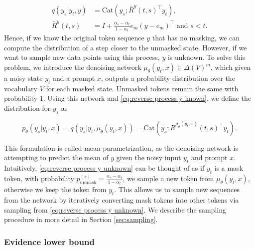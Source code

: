 \begin{align}
    q(y_s | y_t, y)   & = \text{Cat}(y_s; \bar{R}^{y}(t, s)^\top y_t), \label{eq:reverse process y known}            \\
    \bar{R}^{y}(t, s) & = I + \frac{\alpha_s - \alpha_t}{1 - \alpha_t}e_m(y - e_m)^\top \text{ and } s < t.\nonumber
\end{align}
Hence, if we know the original token sequence $y$ that has no masking, we can compute the distribution of a step closer to the unmasked state. However, if we want to sample new data points using this process, $y$ is unknown. To solve this problem, we introduce the denoising network $\mu_\theta(y_t, x)\in\Delta(V)^m$, which given a noisy state $y_t$ and a prompt $x$, outputs a probability distribution over the vocabulary $V$ for each masked state. Unmasked tokens remain the same with probability $1$. Using this network and \eqref{eq:reverse process y known}, we define the distribution for $y_s$ as

\begin{equation}
    p_\theta(y_s | y_t, x) = q(y_s | y_t, \mu_\theta(y_t, x)) = \text{Cat}(y_s; \bar{R}^{\mu_\theta(y_t, x)}(t, s)^\top y_t).
    \label{eq:reverse process y unknown}
\end{equation}

This formulation is called mean-parametrization, as the denoising network is attempting to predict the mean of $y$ given the noisy input $y_t$ and prompt $x$. Intuitively, \eqref{eq:reverse process y unknown} can be thought of as if $y_t$ is a mask token, with probability $p_{\text{unmask}}^{(s)} = \frac{\alpha_s - \alpha_t}{1 - \alpha_t}$, we sample a new token from $\mu_\theta(y_t, x)$, otherwise we keep the token from $y_t$. This allows us to sample new sequences from the network by iteratively converting mask tokens into other tokens via sampling from \eqref{eq:reverse process y unknown}. We describe the sampling procedure in more detail in Section \ref{sec:sampling}.




\subsubsection{Evidence lower bound}
\label{sec:evidence lower bound}

